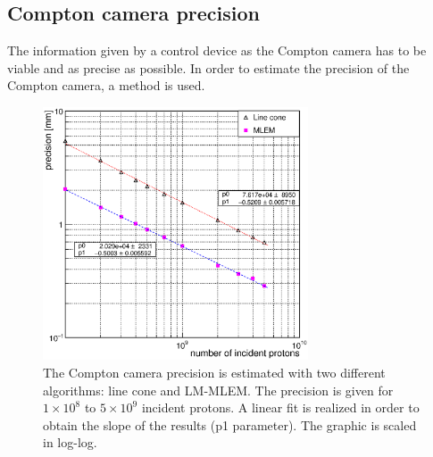 
\subsection{Compton camera precision}
\label{Results::precision}

The information given by a control device as the Compton camera has to be viable and as precise as possible. In order to estimate the precision of the Compton camera, a method is used. 

\begin{figure}[!hbtp]	
\centering
\caption{The Compton camera precision is estimated with two different algorithms: line cone and LM-MLEM. The precision is given for $1\times10^{8}$ to $5\times10^{9}$ incident protons. A linear fit is realized in order to obtain the slope of the results (p1 parameter). The graphic is scaled in log-log. }	
\includegraphics[width=0.7\textwidth]{./Figure/2017-10-21_Precision_Comparaison_linecone_MLEM_Article_Fit.eps}
\end{figure}



